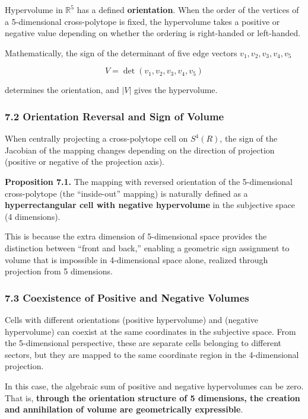 \documentclass[a4paper,11pt]{article}
\begin{document}
Hypervolume in \(\mathbb{R}^5\) has a defined \textbf{orientation}. When
the order of the vertices of a 5-dimensional cross-polytope is fixed,
the hypervolume takes a positive or negative value depending on whether
the ordering is right-handed or left-handed.

Mathematically, the sign of the determinant of five edge vectors
\(v_1, v_2, v_3, v_4, v_5\)

\[V = \det(v_1, v_2, v_3, v_4, v_5)\]

determines the orientation, and \(|V|\) gives the hypervolume.

\subsubsection{7.2 Orientation Reversal and Sign of
Volume}\label{orientation-reversal-and-sign-of-volume}

When centrally projecting a cross-polytope cell on \(S^4(R)\), the sign
of the Jacobian of the mapping changes depending on the direction of
projection (positive or negative of the projection axis).

\textbf{Proposition 7.1.} The mapping with reversed orientation of the
5-dimensional cross-polytope (the ``inside-out'' mapping) is naturally
defined as a \textbf{hyperrectangular cell with negative hypervolume} in
the subjective space (4 dimensions).

This is because the extra dimension of 5-dimensional space provides the
distinction between ``front and back,'' enabling a geometric sign
assignment to volume that is impossible in 4-dimensional space alone,
realized through projection from 5 dimensions.

\subsubsection{7.3 Coexistence of Positive and Negative
Volumes}\label{coexistence-of-positive-and-negative-volumes}

Cells with different orientations (positive hypervolume) and (negative
hypervolume) can coexist at the same coordinates in the subjective
space. From the 5-dimensional perspective, these are separate cells
belonging to different sectors, but they are mapped to the same
coordinate region in the 4-dimensional projection.

In this case, the algebraic sum of positive and negative hypervolumes
can be zero. That is, \textbf{through the orientation structure of 5
dimensions, the creation and annihilation of volume are geometrically
expressible}.
\end{document}
